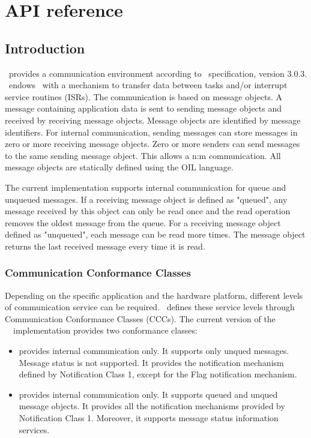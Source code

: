 
\chapter{API reference}
\label{sec:api_reference}

\section{Introduction}
\ee\ provides a communication environment according to
\oc\ specification, version 3.0.3. \oc\ endows \ee\ with a mechanism
to transfer data between tasks and/or interrupt service routines
(ISRs). The communication is based on message objects. A message
containing application data is sent to sending message objects and
received by receiving message objects.  Message objects are identified
by message identifiers. For internal communication, sending messages
can store messages in zero or more receiving message objects. Zero or
more senders can send messages to the same sending message
object. This allows a n:m communication. All message objects are
statically defined using the OIL language.

The current implementation supports internal communication for queue
and unqueued messages. If a receiving message object is defined as
"queued", any message received by this object can only be read once
and the read operation removes the oldest message from the queue. For
a receiving message object defined as "unqueued", each message can be
read more times. The message object returns the last received message
every time it is read.




\subsection{Communication Conformance Classes}
Depending on the specific application and the hardware platform,
different levels of communication service can be
required. \oc\ defines these service levels through Communication
Conformance Classes (CCCs). The current version of the
\ee\ \oc\ implementation provides two conformance classes:

\begin{itemize}
  \item {} provides internal communication only. It supports
    only unqued messages. Message status is not supported. It provides
    the notification mechanism defined by Notification Class 1, except
    for the Flag notification mechanism.

  \item {} provides internal communication only. It supports
    queued and unqued message objects. It provides all the
    notification mechanisms provided by Notification Class
    1. Moreover, it supports message status information services.
\end{itemize}




